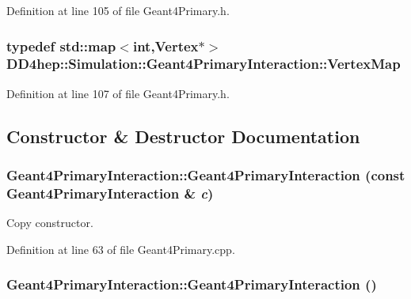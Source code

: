 Definition at line 105 of file Geant4Primary.h.\hypertarget{class_d_d4hep_1_1_simulation_1_1_geant4_primary_interaction_a0016a8298291af16ea8f24a054cb864c}{
\subsubsection[{VertexMap}]{\setlength{\rightskip}{0pt plus 5cm}typedef std::map$<$int,{\bf Vertex}$\ast$$>$ {\bf DD4hep::Simulation::Geant4PrimaryInteraction::VertexMap}}}
\label{class_d_d4hep_1_1_simulation_1_1_geant4_primary_interaction_a0016a8298291af16ea8f24a054cb864c}


Definition at line 107 of file Geant4Primary.h.

\subsection{Constructor \& Destructor Documentation}
\hypertarget{class_d_d4hep_1_1_simulation_1_1_geant4_primary_interaction_a5ffd12789ddae75709c4677e4a6a7cac}{
\subsubsection[{Geant4PrimaryInteraction}]{\setlength{\rightskip}{0pt plus 5cm}Geant4PrimaryInteraction::Geant4PrimaryInteraction (const {\bf Geant4PrimaryInteraction} \& {\em c})}}
\label{class_d_d4hep_1_1_simulation_1_1_geant4_primary_interaction_a5ffd12789ddae75709c4677e4a6a7cac}


Copy constructor. 

Definition at line 63 of file Geant4Primary.cpp.\hypertarget{class_d_d4hep_1_1_simulation_1_1_geant4_primary_interaction_adc7aaf8a360e02d21799182baee96792}{
\subsubsection[{Geant4PrimaryInteraction}]{\setlength{\rightskip}{0pt plus 5cm}Geant4PrimaryInteraction::Geant4PrimaryInteraction ()}}
\label{class_d_d4hep_1_1_simulation_1_1_geant4_primary_interaction_adc7aaf8a360e02d21799182baee96792}


